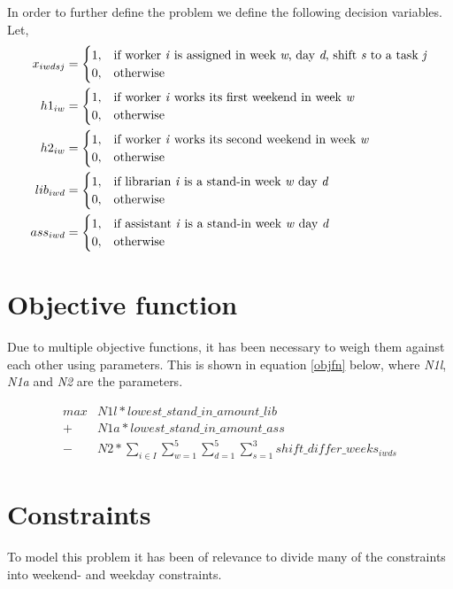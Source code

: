 In order to further define the problem we define the following decision variables. Let,
\begin{align}
    x_{iwdsj}&=
    \begin{cases}
      1, & \text{if worker \textit{i} is assigned in week \textit{w}, day \textit{d}, shift \textit{s} to a task \textit{j}}\\
      0, & \text{otherwise}
    \end{cases}
    \\
    h1_{iw}&=
    \begin{cases}
      1, & \text{if worker \textit{i} works its first weekend in week \textit{w}}\\
      0, & \text{otherwise}
    \end{cases}
    \\
	h2_{iw}&=
	\begin{cases}
	  1, & \text{if worker \textit{i} works its second weekend in week \textit{w}}\\
	  0, & \text{otherwise}
	\end{cases}
	\\
	lib_{iwd}&=
	\begin{cases}
	  1, & \text{if librarian \textit{i} is a stand-in week \textit{w} day \textit{d}} \\
	  0, & \text{otherwise}
	\end{cases}
	\\
	ass_{iwd}&=
	\begin{cases}
 		1, & \text{if assistant \textit{i} is a stand-in week \textit{w} day \textit{d}} \\
 		0, & \text{otherwise}
	\end{cases}
\end{align}





\section{Objective function}
Due to multiple objective functions, it has been necessary to weigh them against each other using parameters. This is shown in equation \ref{objfn} below, where \textit{N1l}, \textit{N1a} and \textit{N2} are the parameters.


\begin{align} \label{objfn}
max &N1l*lowest\_stand\_in\_amount\_lib\\
 + &N1a*lowest\_stand\_in\_amount\_ass \\
 - &N2*\sum_{i \in I}\sum_{w = 1}^{5}\sum_{d = 1}^{5}\sum_{s = 1}^{3} shift\_differ\_weeks_{iwds}
\end{align}



\section{Constraints}
To model this problem it has been of relevance to divide many of the constraints into weekend- and weekday constraints. 